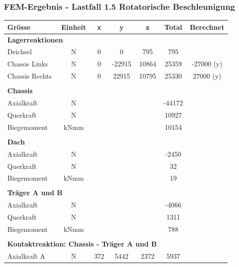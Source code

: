 

  \subsubsection{FEM-Ergebnis - Lastfall 1.5 Rotatorische Beschleunigung}
  \begin{table}[H]
  \centering
  \begin{tabular}{lcccccc}
  Grösse	&	Einheit	&	x	&	y	&	z	&	Total	&	Berechnet	\\	\hline
  \multicolumn{5}{l}{\textbf{Lagerreaktionen}}									&		&		\\	\thickhline
  Deichsel	&	N	&	0	&	0	&	795	&	795	&		\\
  Chassis Links	&	N	&	0	&	-22915	&	10864	&	25359	&	-27000 (y)\footnotemark \\
  Chassis Rechts	&	N	&	0	&	22915	&	10795	&	25330	&	27000 (y)	\\	\hline	\\
  \multicolumn{5}{l}{\textbf{Chassis}}									&		&		\\	\thickhline
  Axialkraft	&	N	&		&		&		&	-44172	&		\\
  Querkraft	&	N	&		&		&		&	10927	&		\\
  Biegemoment	&	kNmm	&		&		&		&	10154	&		\\	\hline	\\
  \multicolumn{5}{l}{\textbf{Dach}}									&		&		\\	\thickhline
  Axialkraft	&	N	&		&		&		&	-2450	&		\\
  Querkraft	&	N	&		&		&		&	32	&		\\
  Biegemoment	&	kNmm	&		&		&		&	19	&		\\	\hline	\\
  \multicolumn{5}{l}{\textbf{Träger A und B}}													\\	\thickhline
  Axialkraft	&	N	&		&		&		&	-4066	&		\\
  Querkraft	&	N	&		&		&		&	1311	&		\\
  Biegemoment	&	kNmm	&		&		&		&	788	&		\\	\hline	\\
  \multicolumn{5}{l}{\textbf{Kontaktreaktion: Chassis - Träger A und B}}									&		&		\\	\thickhline
  Axialkraft A	&	N	&	372	&	5442	&	2372	&	5937	&		\\

\end{tabular}
\end{table}
